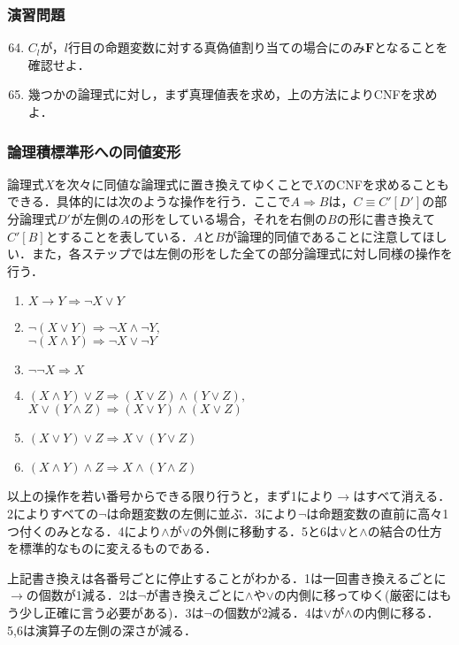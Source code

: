 \documentclass{ltjsarticle}
\theoremstyle{mystyle1}
\theoremstyle{mystyle3}
\theoremstyle{mystyle2}
\newcommand{\bF}{\ensuremath{\mathbf{F}}}
\begin{document}
\subsubsection*{演習問題}
\begin{enumerate}
  \setcounter{enumi}{63}
  \item $C_l$が，$l$行目の命題変数に対する真偽値割り当ての場合にのみ$\bF$となることを確認せよ．
  \item 幾つかの論理式に対し，まず真理値表を求め，上の方法によりCNFを求めよ．
\end{enumerate}
\subsubsection{論理積標準形への同値変形}
論理式$X$を次々に同値な論理式に置き換えてゆくことで$X$のCNFを求めることもできる．具体的には次のような操作を行う．ここで$A\Rightarrow B$は，$C\equiv C'[D']$の部分論理式$D'$が左側の$A$の形をしている場合，それを右側の$B$の形に書き換えて$C'[B]$とすることを表している．$A$と$B$が論理的同値であることに注意してほしい．また，各ステップでは左側の形をした全ての部分論理式に対し同様の操作を行う．
\begin{enumerate}
  \item $X\to Y\Rightarrow\neg X\vee Y$
  \item $\neg(X\vee Y)\Rightarrow\neg X\wedge\neg Y,$\\$\neg(X\wedge Y)\Rightarrow\neg X\vee\neg Y$
  \item $\neg\neg X\Rightarrow X$
  \item $(X\wedge Y)\vee Z \Rightarrow (X\vee Z)\wedge (Y \vee Z),$\\$X\vee(Y\wedge Z)\Rightarrow (X\vee Y)\wedge(X\vee Z)$
  \item $(X\vee Y)\vee Z \Rightarrow X\vee(Y\vee Z)$
  \item $(X\wedge Y)\wedge Z\Rightarrow X \wedge(Y \wedge Z)$
\end{enumerate}
以上の操作を若い番号からできる限り行うと，まず1により$\to$はすべて消える．2によりすべての$\neg$は命題変数の左側に並ぶ．3により$\neg$は命題変数の直前に高々1つ付くのみとなる．4により$\wedge$が$\vee$の外側に移動する．5と6は$\vee$と$\wedge$の結合の仕方を標準的なものに変えるものである．

上記書き換えは各番号ごとに停止することがわかる．1は一回書き換えるごとに$\to$の個数が1減る．2は$\neg$が書き換えごとに$\wedge$や$\vee$の内側に移ってゆく(厳密にはもう少し正確に言う必要がある)．3は$\neg$の個数が2減る．4は$\vee$が$\wedge$の内側に移る．5,6は演算子の左側の深さが減る．
\end{document}
